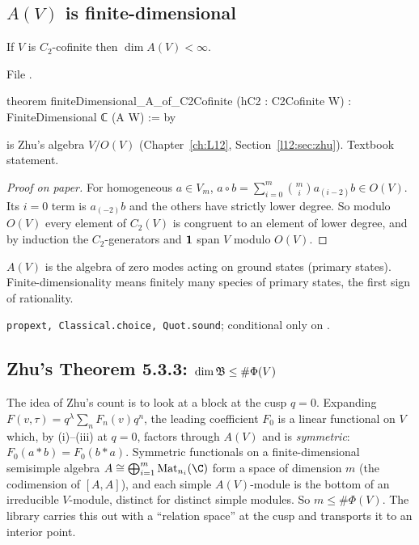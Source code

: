\subsection{\texorpdfstring{$A(V)$}{A(V)} is finite-dimensional}

\begin{theorem}\label{l15:thm:Afin}
If $V$ is $C_2$-cofinite then $\dim A(V)<\infty$.
\end{theorem}
\noindent File .
\begin{leancode}
theorem finiteDimensional_A_of_C2Cofinite (hC2 : C2Cofinite W) :
    FiniteDimensional ℂ (A W) := by
\end{leancode}

\begin{dictionary}
 is Zhu's algebra $V/O(V)$ (Chapter~\ref{ch:L12}, Section~\ref{l12:sec:zhu}). Textbook statement.
\end{dictionary}

\begin{proof}[Proof on paper]
For homogeneous $a\in V_m$, $a\circ b=\sum_{i=0}^m\binom mia_{(i-2)}b\in O(V)$. Its $i=0$ term is $a_{(-2)}b$ and the others
have strictly lower degree. So modulo $O(V)$ every element of $C_2(V)$ is congruent to an element of lower degree, and by
induction the $C_2$-generators and $\mathbf{1}$ span $V$ modulo $O(V)$.
\end{proof}

\begin{physics}
$A(V)$ is the algebra of zero modes acting on ground states (primary states). Finite-dimensionality means finitely many
species of primary states, the first sign of rationality.
\end{physics}

\begin{status}
\texttt{propext, Classical.choice, Quot.sound}; conditional only on .
\end{status}

\subsection{Zhu's Theorem 5.3.3: \texorpdfstring{$\dim\mathfrak{B}\le\#\Phi(V)$}{dim B at most the number of modules}}

The idea of Zhu's count is to look at a block at the cusp $q=0$. Expanding $F(v,\tau)=q^{\lambda}\sum_n F_n(v)q^n$, the
leading coefficient $F_0$ is a linear functional on $V$ which, by (i)--(iii) at $q=0$, factors through $A(V)$ and is
\emph{symmetric}: $F_0(a*b)=F_0(b*a)$. Symmetric functionals on a finite-dimensional semisimple algebra
$A\cong\bigoplus_{i=1}^m\mathrm{Mat}_{n_i}(\C)$ form a space of dimension $m$ (the codimension of $[A,A]$), and each simple
$A(V)$-module is the bottom of an irreducible $V$-module, distinct for distinct simple modules. So $m\le\#\Phi(V)$. The
library carries this out with a ``relation space'' at the cusp and transports it to an interior point.

